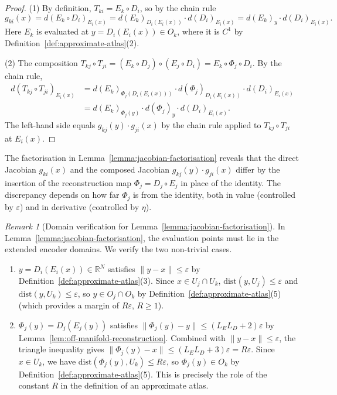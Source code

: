 \documentclass[11pt]{article}
\newcommand{\R}{\mathbb{R}}
\theoremstyle{plain}
\theoremstyle{definition}
\theoremstyle{remark}
\newtheorem{remark}[theorem]{Remark}
\begin{document}
\begin{proof}
(1) By definition, $T_{ki} = E_k \circ D_i$, so by the chain rule
\[
g_{ki}(x) = d(E_k \circ D_i)_{E_i(x)} = d(E_k)_{D_i(E_i(x))} \cdot d(D_i)_{E_i(x)} = d(E_k)_y \cdot d(D_i)_{E_i(x)}.
\]
Here $E_k$ is evaluated at $y = D_i(E_i(x)) \in O_k$, where it is $C^1$ by Definition~\ref{def:approximate-atlas}(2).

(2) The composition $T_{kj} \circ T_{ji} = (E_k \circ D_j) \circ (E_j \circ D_i) = E_k \circ \Phi_j \circ D_i$. By the chain rule,
\begin{align*}
d(T_{kj} \circ T_{ji})_{E_i(x)}
&= d(E_k)_{\Phi_j(D_i(E_i(x)))} \cdot d(\Phi_j)_{D_i(E_i(x))} \cdot d(D_i)_{E_i(x)} \\
&= d(E_k)_{\Phi_j(y)} \cdot d(\Phi_j)_y \cdot d(D_i)_{E_i(x)}.
\end{align*}
The left-hand side equals $g_{kj}(y) \cdot g_{ji}(x)$ by the chain rule applied to $T_{kj} \circ T_{ji}$ at $E_i(x)$.
\end{proof}

The factorisation in Lemma~\ref{lemma:jacobian-factorisation} reveals that the direct Jacobian $g_{ki}(x)$ and the composed Jacobian $g_{kj}(y) \cdot g_{ji}(x)$ differ by the insertion of the reconstruction map $\Phi_j = D_j \circ E_j$ in place of the identity. The discrepancy depends on how far $\Phi_j$ is from the identity, both in value (controlled by $\varepsilon$) and in derivative (controlled by $\eta$).

\begin{remark}[Domain verification for Lemma~\ref{lemma:jacobian-factorisation}]\label{rem:domain-verification}
In Lemma~\ref{lemma:jacobian-factorisation}, the evaluation points must lie in the extended encoder domains. We verify the two non-trivial cases.
\begin{enumerate}
    \item $y = D_i(E_i(x)) \in \R^N$ satisfies $\|y - x\| \leq \varepsilon$ by Definition~\ref{def:approximate-atlas}(3). Since $x \in U_j \cap U_k$, $\mathrm{dist}(y, U_j) \leq \varepsilon$ and $\mathrm{dist}(y, U_k) \leq \varepsilon$, so $y \in O_j \cap O_k$ by Definition~\ref{def:approximate-atlas}(5) (which provides a margin of $R\varepsilon$, $R \geq 1$).
    \item $\Phi_j(y) = D_j(E_j(y))$ satisfies $\|\Phi_j(y) - y\| \leq (L_E L_D + 2)\varepsilon$ by Lemma~\ref{lem:off-manifold-reconstruction}. Combined with $\|y - x\| \leq \varepsilon$, the triangle inequality gives $\|\Phi_j(y) - x\| \leq (L_E L_D + 3)\varepsilon = R\varepsilon$. Since $x \in U_k$, we have $\mathrm{dist}(\Phi_j(y), U_k) \leq R\varepsilon$, so $\Phi_j(y) \in O_k$ by Definition~\ref{def:approximate-atlas}(5). This is precisely the role of the constant $R$ in the definition of an approximate atlas.
\end{enumerate}
\end{remark}
\end{document}
